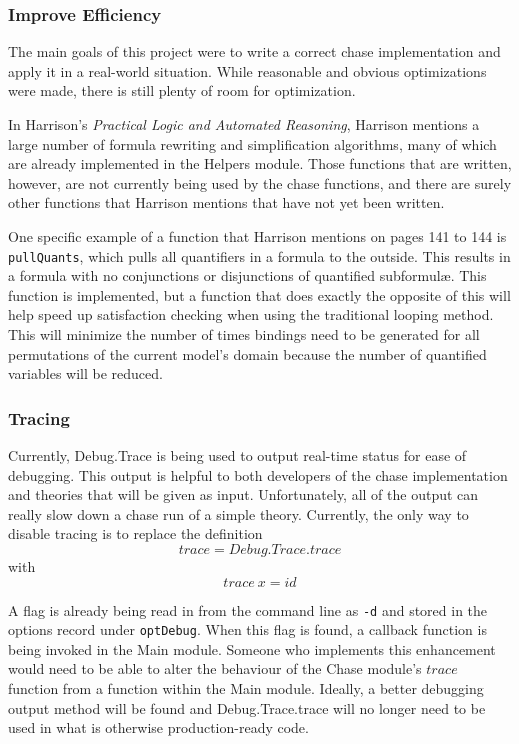 		\subsubsection{Improve Efficiency}

			The main goals of this project were to write a correct chase
			implementation and apply it in a real-world situation. While
			reasonable and obvious optimizations were made, there is still
			plenty of room for optimization.

			In \cite{Harrison09} Harrison's \emph{Practical Logic and Automated
			Reasoning}, Harrison mentions a large number of formula rewriting
			and simplification algorithms, many of which are already
			implemented in the Helpers module. Those functions that are
			written, however, are not currently being used by the chase
			functions, and there are surely other functions that Harrison
			mentions that have not yet been written.

			One specific example of a function that \cite{Harrison09} Harrison
			mentions on pages 141 to 144 is {\tt pullQuants}, which pulls all
			quantifiers in a formula to the outside. This results in a formula
			with no conjunctions or disjunctions of quantified subformul{\ae}.
			This function is implemented, but a function that does exactly the
			opposite of this will help speed up satisfaction checking when
			using the traditional looping method. This will minimize the number
			of times bindings need to be generated for all permutations of the
			current model's domain because the number of quantified variables
			will be reduced.

		\subsubsection{Tracing}

			Currently, Debug.Trace is being used to output real-time status for
			ease of debugging. This output is helpful to both developers of
			the chase implementation and theories that will be given as input.
			Unfortunately, all of the output can really slow down a chase run
			of a simple theory. Currently, the only way to disable tracing is
			to replace the definition \[trace = Debug.Trace.trace\] with
			\[trace\ x = id\]

			A flag is already being read in from the command line as {\tt -d}
			and stored in the options record under {\tt optDebug}. When this
			flag is found, a callback function is being invoked in the Main
			module. Someone who implements this enhancement would need to be
			able to alter the behaviour of the Chase module's $trace$ function
			from a function within the Main module.  Ideally, a better
			debugging output method will be found and Debug.Trace.trace will no
			longer need to be used in what is otherwise production-ready code.
